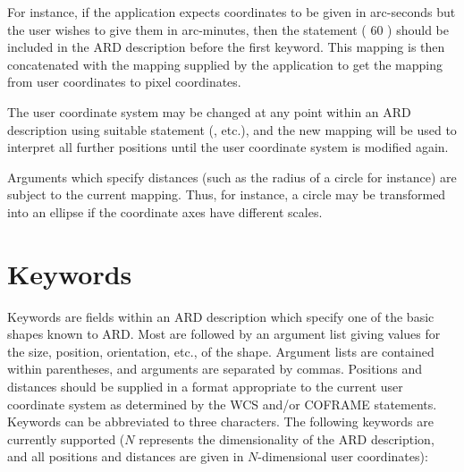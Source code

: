For instance, if the application expects coordinates to be given in
arc-seconds but the user wishes to give them in arc-minutes, then the
statement ( 60 ) should be included in the ARD
description before the first keyword. This mapping is then concatenated
with the mapping supplied by the application to get the mapping from user
coordinates to pixel coordinates.

The user coordinate system may be changed at any point within an ARD
description using suitable statement (, etc.),
and the new mapping will be used to interpret all further positions until
the user coordinate system is modified again.

Arguments which specify distances (such as the radius of a circle for instance)
are subject to the current mapping. Thus, for instance, a circle may be
transformed into an ellipse if the coordinate axes have different scales. 

\section{\label{SEC:KEYW}Keywords}
Keywords are fields within an ARD description which specify one of the
basic shapes known to ARD. Most are followed by an argument list giving
values for the size, position, orientation, etc., of the shape. Argument
lists are contained within parentheses, and arguments are separated by
commas. Positions and distances should be supplied in a format
appropriate to the current user coordinate system as determined by the
WCS and/or COFRAME statements. Keywords can be abbreviated to three
characters. The following keywords are currently supported ($N$
represents the dimensionality of the ARD description, and all positions
and distances are given in $N$-dimensional user coordinates):

